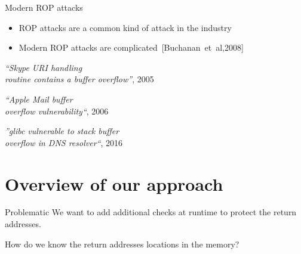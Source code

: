 \documentclass{beamer}
\begin{document}
\begin{frame}[c]{Modern ROP attacks}
	\begin{itemize}
		\item ROP attacks are a common kind of attack in the industry
		\item Modern ROP attacks are complicated~[Buchanan~et~al,2008]
	\end{itemize}
	\begin{center}
		\textit{``Skype URI handling\\ routine contains a buffer overflow''}, 2005\footnotemark \\
	\end{center}
	\vspace{4mm}
	\textit{``Apple Mail buffer \\overflow vulnerability``}, 2006\\
	\begin{flushright}
		\textit{''glibc vulnerable to stack buffer \\overflow in DNS resolver``}, 2016
	\end{flushright}

\end{frame}




\section{Overview of our approach}
\label{sec:Overview of our approach}




\begin{frame}[c]{Problematic}
	We want to add additional checks at runtime to protect the return addresses. \\
	\begin{center}
		{\Large How do we know the return addresses locations in the memory?}	
		\break
		\break
		\visible<2>{\textcolor{red}{$\Rightarrow$~Modify the memory structure to have an easy way to distinguish return addresses locations}}
	\end{center}
\end{frame}
\end{document}
